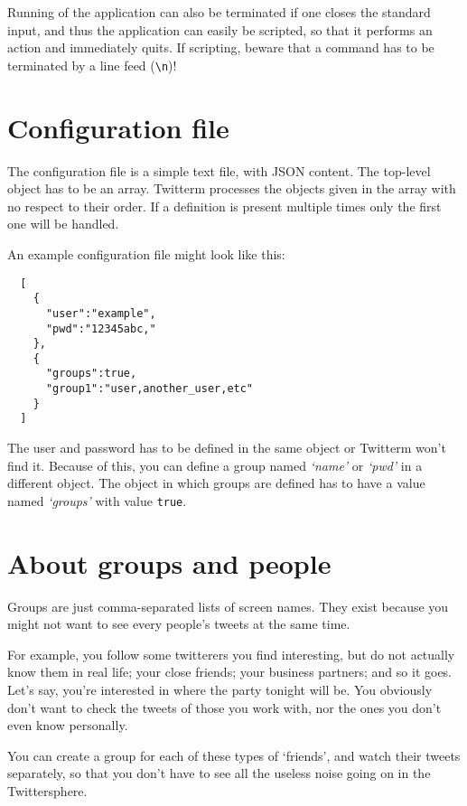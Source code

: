\documentclass[10pt]{article}
\begin{document}
Running of the application can also be terminated if one closes the standard input, and thus the application can easily be scripted, so that it performs an action and immediately quits. If scripting, beware that a command has to be terminated by a line feed (\verb!\n!)!

\section{Configuration file}
The configuration file is a simple text file, with JSON content. The top-level object has to be an array. Twitterm processes the objects given in the array with no respect to their order. If a definition is present multiple times only the first one will be handled.

An example configuration file might look like this:

\begin{verbatim}	
  [
    {
      "user":"example",
      "pwd":"12345abc,"
    },
    {
      "groups":true,
      "group1":"user,another_user,etc"
    }
  ]	
\end{verbatim}

The user and password has to be defined in the same object or Twitterm won't find it. Because of this, you can define a group named \textit{`name'} or \textit{`pwd'} in a different object. The object in which groups are defined has to have a value named \textit{`groups'} with value \verb!true!.

\section{About groups and people}
Groups are just comma-separated lists of screen names. They exist because you might not want to see every people's tweets at the same time.

For example, you follow some twitterers you find interesting, but do not actually know them in real life; your close friends; your business partners; and so it goes. Let's say, you're interested in where the party tonight will be. You obviously don't want to check the tweets of those you work with, nor the ones you don't even know personally.

You can create a group for each of these types of `friends', and watch their tweets separately, so that you don't have to see all the useless noise going on in the Twittersphere.
\end{document}
